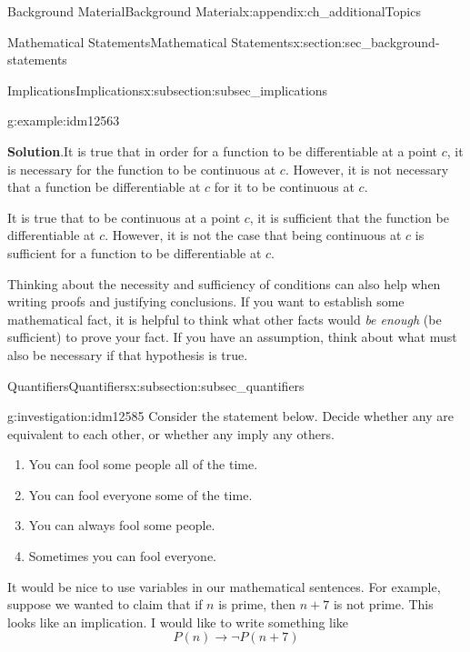 \documentclass[oneside,10pt,]{book}
\numberwithin{equation}{chapter}
\def\imp{\rightarrow}
\begin{document}
\begin{appendixptx}{Background Material}{}{Background Material}{}{}{x:appendix:ch_additionalTopics}
\begin{sectionptx}{Mathematical Statements}{}{Mathematical Statements}{}{}{x:section:sec_background-statements}
\begin{subsectionptx}{Implications}{}{Implications}{}{}{x:subsection:subsec_implications}
\begin{example}{}{g:example:idm12563}
\par\smallskip%
\noindent\textbf{Solution}.\hypertarget{g:solution:idm12570}{}\quad{}It is true that in order for a function to be differentiable at a point \(c\), it is necessary for the function to be continuous at \(c\). However, it is not necessary that a function be differentiable at \(c\) for it to be continuous at \(c\).%
\par
It is true that to be continuous at a point \(c\), it is sufficient that the function be differentiable at \(c\). However, it is not the case that being continuous at \(c\) is sufficient for a function to be differentiable at \(c\).%
\end{example}
Thinking about the necessity and sufficiency of conditions can also help when writing proofs and justifying conclusions. If you want to establish some mathematical fact, it is helpful to think what other facts would \emph{be enough} (be sufficient) to prove your fact. If you have an assumption, think about what must also be necessary if that hypothesis is true.%
\end{subsectionptx}
%
%
\typeout{************************************************}
\typeout{************************************************}
%
\begin{subsectionptx}{Quantifiers}{}{Quantifiers}{}{}{x:subsection:subsec_quantifiers}
\begin{investigation}{}{g:investigation:idm12585}%
Consider the statement below. Decide whether any are equivalent to each other, or whether any imply any others.%
\par
%
\begin{enumerate}
\item{}You can fool some people all of the time.%
\item{}You can fool everyone some of the time.%
\item{}You can always fool some people.%
\item{}Sometimes you can fool everyone.%
\end{enumerate}
%
\end{investigation}
It would be nice to use variables in our mathematical sentences. For example, suppose we wanted to claim that if \(n\) is prime, then \(n+7\) is not prime. This looks like an implication. I would like to write something like%
\begin{equation*}
P(n) \imp \neg P(n+7) 
\end{equation*}

\end{subsectionptx}
\end{sectionptx}
\end{appendixptx}
\end{document}

